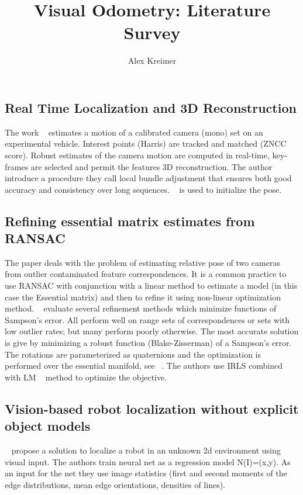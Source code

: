 \documentclass[10pt]{article}         %
\title{Visual Odometry: Literature Survey}
\author{Alex Kreimer}
\begin{document}
\maketitle

\begin{abstract}
\end{abstract}

\subsection{Real Time Localization and 3D Reconstruction}
The work ~\cite{mouragnon2006real} estimates a motion of a calibrated
camera (mono) set on an experimental vehicle.  Interest points (Harris) are
tracked and matched (ZNCC score). Robust estimates of the camera motion are
computed in real-time, key-frames are selected and permit the features
3D reconstruction.  The author introduce a procedure they call local
bundle adjustment that ensures both good accuracy and consistency over
long sequences. ~\cite{nister2004efficient} is used to initialize the pose.

\subsection{Refining essential matrix estimates from RANSAC}
The paper deals with the problem of estimating relative pose of two
cameras from outlier contaminated feature correspondences.  It is a
common practice to use RANSAC with conjunction with a linear method to
estimate a model (in this case the Essential matrix) and then to
refine it using non-linear optimization
method. ~\cite{botterillrefining} evaluate several refinement methods
which minimize functions of Sampson's error.  All perform well on
range sets of correspondences or sets with low outlier rates; but many
perform poorly otherwise.  The most accurate solution is give by
minimizing a robust function (Blake-Zisserman) of a Sampson's error.
The rotations are parameterized as quaternions and the optimization is
performed over the essential manifold, see ~\cite{schmidt2001using}.
The authors use IRLS combined with LM ~\cite{marquardt1963algorithm}
method to optimize the objective.

\subsection{Vision-based robot localization without explicit object models}
~\cite{dudek1996vision} propose a solution to localize a robot in an
unknown 2d environment using visual input. The authors train neural
net as a regression model N(I)=(x,y).  As an input for the net they
use image statistics (first and second moments of the edge
distributions, mean edge orientations, densities of lines).
\end{document}
